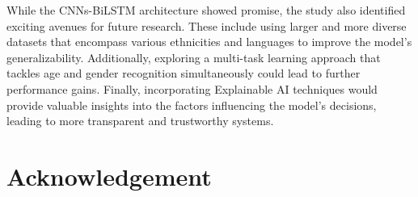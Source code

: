 \documentclass[conference, 10pt,onecolumn]{IEEEtran}
\begin{document}
While the CNNs-BiLSTM architecture showed promise, the study also identified exciting avenues for future research. These include using larger and more diverse datasets that encompass various ethnicities and languages to improve the model's generalizability. Additionally, exploring a multi-task learning approach that tackles age and gender recognition simultaneously could lead to further performance gains. Finally, incorporating Explainable AI techniques would provide valuable insights into the factors influencing the model's decisions, leading to more transparent and trustworthy systems.

\section{Acknowledgement}
\end{document}
